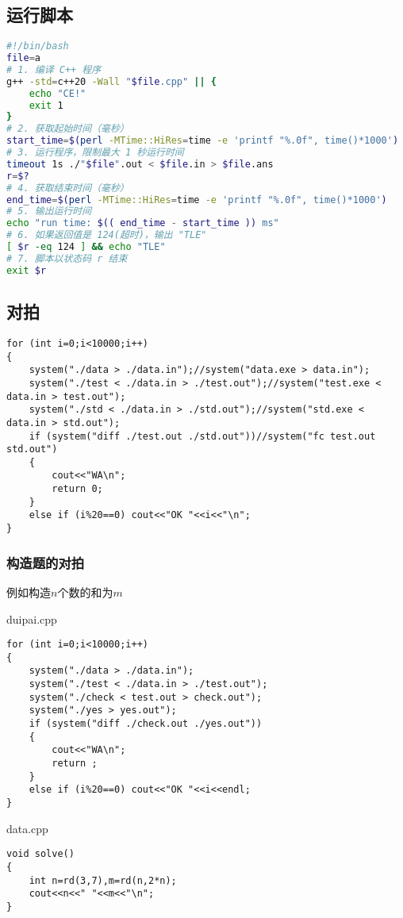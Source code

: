 \documentclass[a4paper]{ctexart}
\begin{document}
\subsection{运行脚本}
\begin{lstlisting}[language=bash]
#!/bin/bash
file=a
# 1. 编译 C++ 程序
g++ -std=c++20 -Wall "$file.cpp" || {
    echo "CE!"
    exit 1
}
# 2. 获取起始时间（毫秒）
start_time=$(perl -MTime::HiRes=time -e 'printf "%.0f", time()*1000')
# 3. 运行程序，限制最大 1 秒运行时间
timeout 1s ./"$file".out < $file.in > $file.ans
r=$?
# 4. 获取结束时间（毫秒）
end_time=$(perl -MTime::HiRes=time -e 'printf "%.0f", time()*1000')
# 5. 输出运行时间
echo "run time: $(( end_time - start_time )) ms"
# 6. 如果返回值是 124(超时)，输出 "TLE"
[ $r -eq 124 ] && echo "TLE"
# 7. 脚本以状态码 r 结束
exit $r
\end{lstlisting}

\subsection{对拍}

\begin{lstlisting}
for (int i=0;i<10000;i++)
{
    system("./data > ./data.in");//system("data.exe > data.in");
    system("./test < ./data.in > ./test.out");//system("test.exe < data.in > test.out");
    system("./std < ./data.in > ./std.out");//system("std.exe < data.in > std.out");
    if (system("diff ./test.out ./std.out"))//system("fc test.out std.out")
    {
        cout<<"WA\n";
        return 0;
    } 
    else if (i%20==0) cout<<"OK "<<i<<"\n";
}
\end{lstlisting}

\subsubsection{构造题的对拍}

例如构造$n$个数的和为$m$

duipai.cpp
\begin{lstlisting}
for (int i=0;i<10000;i++)
{
    system("./data > ./data.in");
    system("./test < ./data.in > ./test.out");
    system("./check < test.out > check.out");
    system("./yes > yes.out");
    if (system("diff ./check.out ./yes.out"))
    {
        cout<<"WA\n";
        return ;
    }
    else if (i%20==0) cout<<"OK "<<i<<endl;
}
\end{lstlisting}

data.cpp
\begin{lstlisting}
void solve()
{
    int n=rd(3,7),m=rd(n,2*n);
    cout<<n<<" "<<m<<"\n";
}
\end{lstlisting}
\end{document}
